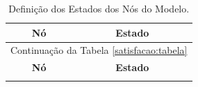 \begin{center}
\begin{longtable}{
|p{0.30\dimexpr \textwidth-3\arrayrulewidth-3\tabcolsep\relax}|
 p{0.08\dimexpr \textwidth-3\arrayrulewidth-3\tabcolsep\relax}|
 p{0.62\dimexpr \textwidth-3\arrayrulewidth-3\tabcolsep\relax}|
}
\caption{Definição dos Estados dos Nós do Modelo. \label{modelo:gad:tabela}} \\

\hline
\multicolumn{1}{|c|}{\textbf{Nó}} & \multicolumn{2}{|c|}{\textbf{Estado}} \\
\hline
\endfirsthead

\hline
\multicolumn{3}{|c|}{Continuação da Tabela \ref{satisfacao:tabela}}\\
\hline
\multicolumn{1}{|c|}{\textbf{Nó}} & \multicolumn{2}{|c|}{\textbf{Estado}} \\
\hline
\endhead

\hline
\endfoot

\hline


\end{longtable}
\end{center}
